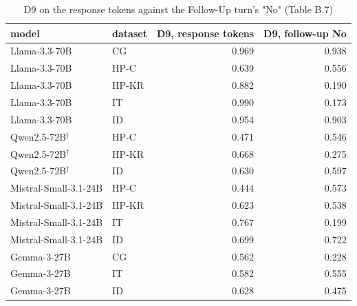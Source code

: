 \begin{table}
\caption{D9 on the response tokens against the Follow-Up turn's "No" (Table B.7)}
\label{tab:x-followup}
\begin{tabular}{llrr}
\toprule
model & dataset & D9, response tokens & D9, follow-up No \\
\midrule
Llama-3.3-70B & CG & 0.969 & 0.938 \\
Llama-3.3-70B & HP-C & 0.639 & 0.556 \\
Llama-3.3-70B & HP-KR & 0.882 & 0.190 \\
Llama-3.3-70B & IT & 0.990 & 0.173 \\
Llama-3.3-70B & ID & 0.954 & 0.903 \\
Qwen2.5-72B$^\dagger$ & HP-C & 0.471 & 0.546 \\
Qwen2.5-72B$^\dagger$ & HP-KR & 0.668 & 0.275 \\
Qwen2.5-72B$^\dagger$ & ID & 0.630 & 0.597 \\
Mistral-Small-3.1-24B & HP-C & 0.444 & 0.573 \\
Mistral-Small-3.1-24B & HP-KR & 0.623 & 0.538 \\
Mistral-Small-3.1-24B & IT & 0.767 & 0.199 \\
Mistral-Small-3.1-24B & ID & 0.699 & 0.722 \\
Gemma-3-27B & CG & 0.562 & 0.228 \\
Gemma-3-27B & IT & 0.582 & 0.555 \\
Gemma-3-27B & ID & 0.628 & 0.475 \\
\bottomrule
\end{tabular}
\end{table}
